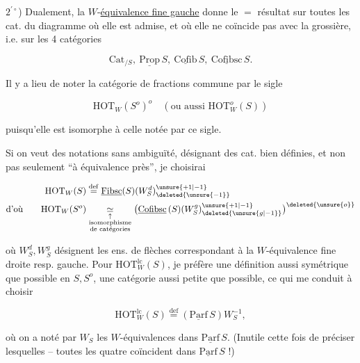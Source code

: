 $2^{'\circ}$) Dualement, la $W$-\uline{équivalence fine gauche} donne le $=$ résultat sur toutes les cat. du diagramme où elle est admise, et où elle ne coïncide pas avec la grossière, i.e. sur les 4 catégories

\[
 \mathrm{Cat}_{/S},\ \underline{\mathrm{Prop}}\,S,\ \underline{\mathrm{Cofib}}\,S,\ \underline{\mathrm{Cofibsc}}\,S.
\]

Il y a lieu de noter la catégorie de fractions commune par le sigle

\[
 \mathrm{HOT}_W(S^o)^o \quad(\text{ou aussi }\mathrm{HOT}^o_W(S))
\]

puisqu'elle est isomorphe à celle notée par ce sigle.

Si on veut des notations sans ambiguïté, désignant des cat. bien définies, et non pas seulement ``à équivalence près'', je choisirai

\[
 \begin{aligned}
 \mathrm{HOT}_W(S)&\overset{\mathrm{def}}{=}\underline{\mathrm{Fibsc}}(S)(W^d_S)_{\deleted{\unsure{-1}}}^{\unsure{+1|-1}}\\
 \text{d'où}\qquad \mathrm{HOT}_W(S^o)&\underset{\substack{\uparrow\\\text{isomorphisme}\\\text{de catégories}}}{\simeq}
 \bigl(\underline{\mathrm{Cofibsc}}\,(S)(W^g_S)_{\deleted{\unsure{g|-1}}}^{\unsure{+1|-1}}\bigr)^{\deleted{\unsure{o}}}
 \end{aligned}
\]

où $W^d_S,W^g_S$ désignent les ens. de flèches correspondant à la $W$-équivalence fine droite resp. gauche. Pour $\mathrm{HOT}^{\mathrm{lc}}_W(S)$, je préfère une définition aussi symétrique que possible en $S,S^o$,    une catégorie aussi petite que possible, ce qui me conduit à choisir

\[
 \mathrm{HOT}^{\mathrm{lc}}_W(S)\overset{\mathrm{def}}{=}(\underline{\mathrm{Parf}}\,S)W_S^{-1},
\]

où on a noté par $W_S$ les $W$-équivalences dans $\underline{\mathrm{Parf}}\,S$. (Inutile cette fois de préciser lesquelles -- toutes les quatre coïncident dans $\underline{\mathrm{Parf}}\,S$ !)

